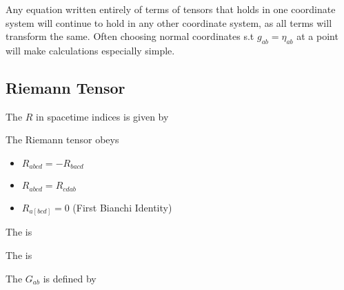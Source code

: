 \documentclass{article}
\begin{document}
\begin{idea}
Any equation written entirely of terms of tensors that holds in one coordinate system will continue to hold in any other coordinate system, as all terms will transform the same. Often choosing normal coordinates s.t $g_{ab} = \eta_{ab}$ at a point will make calculations especially simple. 
\end{idea}

\subsection{Riemann Tensor}

\begin{definition}
The  $R$ in spacetime indices is given by
\end{definition}

\begin{theorem}
The Riemann tensor obeys 
\begin{itemize}
    \item $R_{abcd} = -R_{bacd}$
    \item $R_{abcd} = R_{cdab}$
    \item $R_{a[bcd]} = 0$ (First Bianchi Identity)
\end{itemize}
\end{theorem}

\begin{definition}
The  is 
\end{definition}

\begin{definition}
The  is 
\end{definition}

\begin{definition}
The  $G_{ab}$ is defined by 
\end{definition}

\begin{lemma}
\end{lemma}
\end{document}
